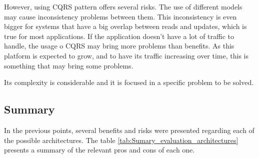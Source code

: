 However, using \gls{CQRS} pattern offers several risks. The use of different models may cause inconsistency problems between them. This inconsistency is even bigger for systems that have a big overlap between reads and updates, which is true for most applications. If the application doesn't have a lot of traffic to handle, the usage o \gls{CQRS} may bring more problems than benefits. As this platform is expected to grow, and to have its traffic increasing over time, this is something that may bring some problems. 

\par 
Its complexity is considerable and it is focused in a specific problem to be solved.

\subsection{Summary}
\label{sub:ExistentSolutions_Architecture_Summary}
In the previous points, several benefits and risks were presented regarding each of the possible architectures. The table \ref{tab:Sumary_evaluation_architectures} presents a summary of the relevant pros and cons of each one.

\par


